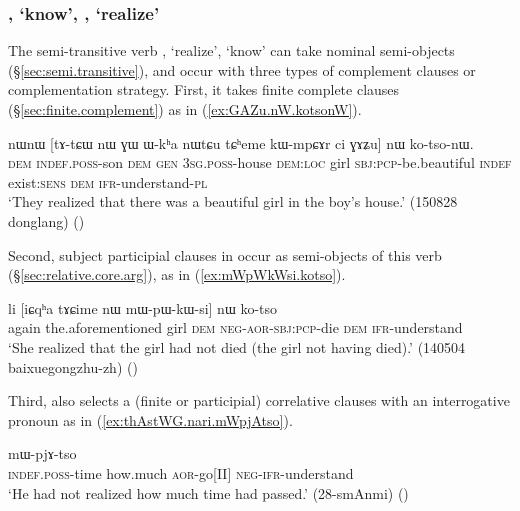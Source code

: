 \subsubsection{, `know', , `realize'} \label{sec:tso.sWXsAl}
The semi-transitive verb , `realize',  `know' can take nominal semi-objects (§\ref{sec:semi.transitive}), and occur with three types of complement clauses or complementation strategy. First, it takes finite complete clauses (§\ref{sec:finite.complement}) as in (\ref{ex:GAZu.nW.kotsonW}).

\begin{exe}
\ex \label{ex:GAZu.nW.kotsonW}
\gll  nɯnɯ [tɤ-tɕɯ nɯ ɣɯ ɯ-kʰa nɯtɕu tɕʰeme kɯ-mpɕɤr ci ɣɤʑu] nɯ ko-tso-nɯ. \\
\textsc{dem} \textsc{indef}.\textsc{poss}-son \textsc{dem} \textsc{gen} \textsc{3sg}.\textsc{poss}-house \textsc{dem}:\textsc{loc} girl \textsc{sbj}:\textsc{pcp}-be.beautiful \textsc{indef} exist:\textsc{sens} \textsc{dem} \textsc{ifr}-understand-\textsc{pl} \\
\glt `They realized that there was a beautiful girl in the boy's house.' (150828 donglang)
()
\end{exe}

Second, subject participial clauses in  occur as semi-objects of this verb (§\ref{sec:relative.core.arg}), as in (\ref{ex:mWpWkWsi.kotso}).

\begin{exe}
\ex \label{ex:mWpWkWsi.kotso}
\gll  li [iɕqʰa tɤɕime nɯ mɯ-pɯ-kɯ-si] nɯ ko-tso \\
again the.aforementioned girl \textsc{dem} \textsc{neg}-\textsc{aor}-\textsc{sbj}:\textsc{pcp}-die \textsc{dem} \textsc{ifr}-understand \\
\glt  `She realized that the girl had not died (the girl not having died).' (140504 baixuegongzhu-zh)
()
\end{exe}

Third,  also selects a (finite or participial) correlative clauses with an interrogative pronoun as in (\ref{ex:thAstWG.nari.mWpjAtso}).

\begin{exe}
\ex \label{ex:thAstWG.nari.mWpjAtso}
 mɯ-pjɤ-tso \\
\textsc{indef}.\textsc{poss}-time how.much \textsc{aor}-go[II] \textsc{neg}-\textsc{ifr}-understand \\
\glt `He had not realized how much time had passed.' (28-smAnmi)
()
\end{exe}

